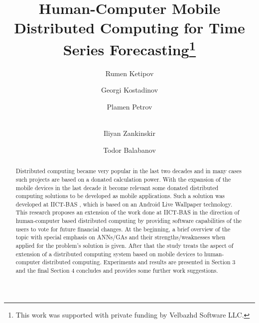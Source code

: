\documentclass[runningheads]{llncs}
\begin{document}
\title{Human-Computer Mobile Distributed Computing for Time Series Forecasting\thanks{This work was supported with private funding by Velbazhd Software LLC.}}

\author{
	Rumen Ketipov \and
	Georgi Kostadinov \and
	Plamen Petrov \and \\
	Iliyan Zankinskir \and
	Todor Balabanov
}



\maketitle

\begin{abstract}
Distributed computing became very popular in the last two decades and in many cases such projects are based on a donated calculation power. With the expansion of the mobile devices in the last decade it become relevant some donated distributed computing solutions to be developed as mobile applications. Such a solution was developed at IICT-BAS \cite{tomov01}, which is based on an Android Live Wallpaper technology. This research proposes an extension of the work done at IICT-BAS in the direction of human-computer based distributed computing by providing software capabilities of the users to vote for future financial changes.
At the beginning, a brief overview of the topic with special emphasis on ANNs/GAs and their strengths/weaknesses when applied for the problem's solution is given. After that the study treats the aspect of extension of a distributed computing system based on mobile devices to human-computer distributed computing. Experiments and results are presented in Section 3 and the final Section 4 concludes and provides some further work suggestions.

\end{abstract}
\end{document}
